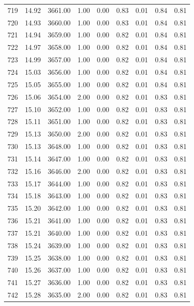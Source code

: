 \documentclass{article}\usepackage[]{graphicx}\usepackage[]{color}
\begin{document}
\begin{longtable}{rrrrrrrrr}
  719 & 14.92 & 3661.00 & 1.00 & 0.00 & 0.83 & 0.01 & 0.84 & 0.81 \\ 
  720 & 14.93 & 3660.00 & 1.00 & 0.00 & 0.83 & 0.01 & 0.84 & 0.81 \\ 
  721 & 14.94 & 3659.00 & 1.00 & 0.00 & 0.82 & 0.01 & 0.84 & 0.81 \\ 
  722 & 14.97 & 3658.00 & 1.00 & 0.00 & 0.82 & 0.01 & 0.84 & 0.81 \\ 
  723 & 14.99 & 3657.00 & 1.00 & 0.00 & 0.82 & 0.01 & 0.84 & 0.81 \\ 
  724 & 15.03 & 3656.00 & 1.00 & 0.00 & 0.82 & 0.01 & 0.84 & 0.81 \\ 
  725 & 15.05 & 3655.00 & 1.00 & 0.00 & 0.82 & 0.01 & 0.84 & 0.81 \\ 
  726 & 15.06 & 3654.00 & 2.00 & 0.00 & 0.82 & 0.01 & 0.83 & 0.81 \\ 
  727 & 15.10 & 3652.00 & 1.00 & 0.00 & 0.82 & 0.01 & 0.83 & 0.81 \\ 
  728 & 15.11 & 3651.00 & 1.00 & 0.00 & 0.82 & 0.01 & 0.83 & 0.81 \\ 
  729 & 15.13 & 3650.00 & 2.00 & 0.00 & 0.82 & 0.01 & 0.83 & 0.81 \\ 
  730 & 15.13 & 3648.00 & 1.00 & 0.00 & 0.82 & 0.01 & 0.83 & 0.81 \\ 
  731 & 15.14 & 3647.00 & 1.00 & 0.00 & 0.82 & 0.01 & 0.83 & 0.81 \\ 
  732 & 15.16 & 3646.00 & 2.00 & 0.00 & 0.82 & 0.01 & 0.83 & 0.81 \\ 
  733 & 15.17 & 3644.00 & 1.00 & 0.00 & 0.82 & 0.01 & 0.83 & 0.81 \\ 
  734 & 15.18 & 3643.00 & 1.00 & 0.00 & 0.82 & 0.01 & 0.83 & 0.81 \\ 
  735 & 15.20 & 3642.00 & 1.00 & 0.00 & 0.82 & 0.01 & 0.83 & 0.81 \\ 
  736 & 15.21 & 3641.00 & 1.00 & 0.00 & 0.82 & 0.01 & 0.83 & 0.81 \\ 
  737 & 15.21 & 3640.00 & 1.00 & 0.00 & 0.82 & 0.01 & 0.83 & 0.81 \\ 
  738 & 15.24 & 3639.00 & 1.00 & 0.00 & 0.82 & 0.01 & 0.83 & 0.81 \\ 
  739 & 15.25 & 3638.00 & 1.00 & 0.00 & 0.82 & 0.01 & 0.83 & 0.81 \\ 
  740 & 15.26 & 3637.00 & 1.00 & 0.00 & 0.82 & 0.01 & 0.83 & 0.81 \\ 
  741 & 15.27 & 3636.00 & 1.00 & 0.00 & 0.82 & 0.01 & 0.83 & 0.81 \\ 
  742 & 15.28 & 3635.00 & 2.00 & 0.00 & 0.82 & 0.01 & 0.83 & 0.81 \\ 

\end{longtable}
\end{document}
